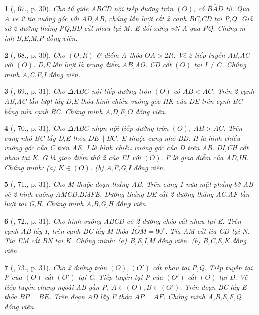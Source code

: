 \documentclass{article}
\newtheorem{baitoan}{}
\begin{document}
\begin{baitoan}[\cite{Thu_Chung_Viet_Minh_circ}, 67., p. 30]
	Cho tứ giác ABCD nội tiếp đường tròn $(O)$, có $\widehat{BAD}$ tù. Qua A vẽ 2 tia vuông góc với AD,AB, chúng lần lượt cắt 2 cạnh BC,CD tại P,Q. Giả sử 2 đường thẳng PQ,BD cắt nhau tại M. E đối xứng với A qua PQ. Chứng m inh B,E,M,P đồng viên.
\end{baitoan}

\begin{baitoan}[\cite{Thu_Chung_Viet_Minh_circ}, 68., p. 30]
	Cho $(O;R)$ \& điểm A thỏa $OA > 2R$. Vẽ 2 tiếp tuyến AB,AC với $(O)$. D,E lần lượt là trung điểm AB,AO. CD cắt $(O)$ tại $I\ne C$. Chứng minh A,C,E,I đồng viên.
\end{baitoan}

\begin{baitoan}[\cite{Thu_Chung_Viet_Minh_circ}, 69., p. 31]
	Cho $\Delta ABC$ nội tiếp đường tròn $(O)$ có $AB < AC$. Trên 2 cạnh AB,AC lần lượt lấy D,E thỏa hình chiếu vuông góc HK của DE trên cạnh BC bằng nửa cạnh BC. Chứng minh A,D,E,O đồng viên.
\end{baitoan}

\begin{baitoan}[\cite{Thu_Chung_Viet_Minh_circ}, 70., p. 31]
	Cho $\Delta ABC$ nhọn nội tiếp đường tròn $(O)$, $AB > AC$. Trên cung nhỏ BC lấy D,E thỏa $DE\parallel BC$, E thuộc cung nhỏ BD. H là hình chiếu vuông góc của C trên AE. I là hình chiếu vuông góc của D trên AB. DI,CH cắt nhau tại K. G là giao điểm thứ 2 của EI với $(O)$. F là giao điểm của AD,IH. Chứng minh: (a) $K\in(O)$. (b) A,F,G,I đồng viên.
\end{baitoan}

\begin{baitoan}[\cite{Thu_Chung_Viet_Minh_circ}, 71., p. 31]
	Cho M thuộc đoạn thẳng AB. Trên cùng 1 nửa mặt phẳng bờ AB vẽ 2 hình vuông AMCD,BMFE. Đường thẳng DE cắt 2 đường thẳng AC,AF lần lượt tại G,H. Chứng minh A,B,G,H đồng viên.
\end{baitoan}

\begin{baitoan}[\cite{Thu_Chung_Viet_Minh_circ}, 72., p. 31]
	Cho hình vuông ABCD có 2 đường chéo cắt nhau tại E. Trên cạnh AB lấy I, trên cạnh BC lấy M thỏa $\widehat{IOM} = 90^\circ$. Tia AM cắt tia CD tại N. Tia EM cắt BN tại K. Chứng minh: (a) B,E,I,M đồng viên. (b) B,C,E,K đồng viên.
\end{baitoan}

\begin{baitoan}[\cite{Thu_Chung_Viet_Minh_circ}, 73., p. 31]
	Cho 2 đường tròn $(O),(O')$ cắt nhau tại P,Q. Tiếp tuyến tại P của $(O)$ cắt $(O')$ tại C. Tiếp tuyến tại P của $(O')$ cắt $(O)$ tại D. Vẽ tiếp tuyến chung ngoài AB gần P, $A\in(O),B\in(O')$. Trên đoạn BC lấy E thỏa $BP = BE$. Trên đoạn AD lấy F thỏa $AP = AF$. Chứng minh A,B,E,F,Q đồng viên.
\end{baitoan}
\end{document}
